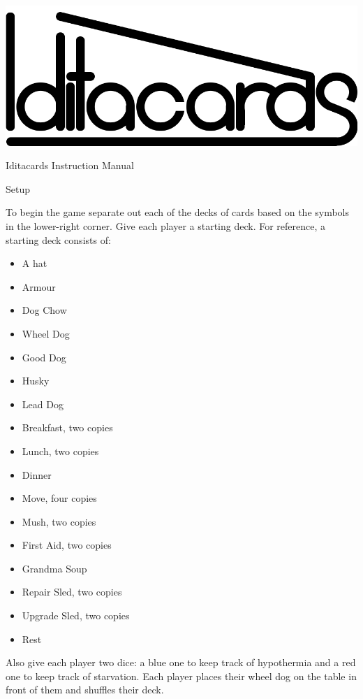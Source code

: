 \documentclass{article}
\begin{document}
\begin{titlepage}
\
\vfill
\centering
\includegraphics{iditacards}\par\vspace{5em}
{\Heading\LARGE Iditacards Instruction Manual\par}
\vfill
\end{titlepage}

{\noindent\Heading\Large Setup\par}

To begin the game separate out each of the decks of cards based on the
symbols in the lower-right corner. Give each player a starting deck. For
reference, a starting deck consists of:

\begin{itemize}[noitemsep]
\item A hat
\item Armour
\item Dog Chow
\item Wheel Dog
\item Good Dog
\item Husky
\item Lead Dog
\item Breakfast, two copies
\item Lunch, two copies
\item Dinner
\item Move, four copies
\item Mush, two copies
\item First Aid, two copies
\item Grandma Soup
\item Repair Sled, two copies
\item Upgrade Sled, two copies
\item Rest
\end{itemize}

Also give each player two dice: a blue one to keep track of hypothermia and a
red one to keep track of starvation. Each player places their wheel dog on the
table in front of them and shuffles their deck.
\end{document}
